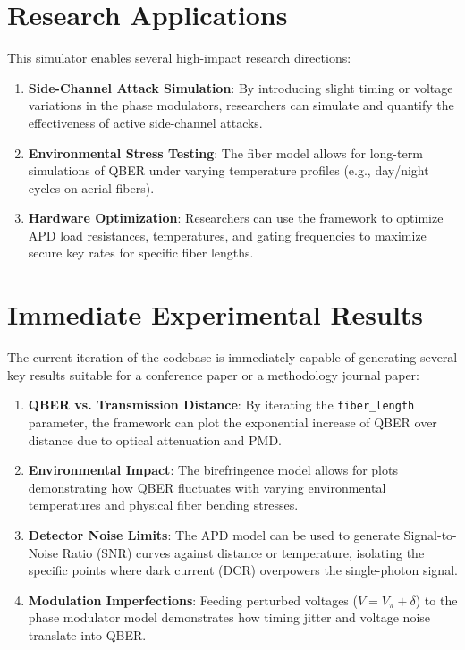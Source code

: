 \documentclass[12pt,a4paper]{article}
\begin{document}
\section{Research Applications}
This simulator enables several high-impact research directions:
\begin{enumerate}
    \item \textbf{Side-Channel Attack Simulation}: By introducing slight timing or voltage variations in the phase modulators, researchers can simulate and quantify the effectiveness of active side-channel attacks.
    \item \textbf{Environmental Stress Testing}: The fiber model allows for long-term simulations of QBER under varying temperature profiles (e.g., day/night cycles on aerial fibers).
    \item \textbf{Hardware Optimization}: Researchers can use the framework to optimize APD load resistances, temperatures, and gating frequencies to maximize secure key rates for specific fiber lengths.
\end{enumerate}

\section{Immediate Experimental Results}
The current iteration of the codebase is immediately capable of generating several key results suitable for a conference paper or a methodology journal paper:
\begin{enumerate}
    \item \textbf{QBER vs. Transmission Distance}: By iterating the \texttt{fiber\_length} parameter, the framework can plot the exponential increase of QBER over distance due to optical attenuation and PMD.
    \item \textbf{Environmental Impact}: The birefringence model allows for plots demonstrating how QBER fluctuates with varying environmental temperatures and physical fiber bending stresses.
    \item \textbf{Detector Noise Limits}: The APD model can be used to generate Signal-to-Noise Ratio (SNR) curves against distance or temperature, isolating the specific points where dark current (DCR) overpowers the single-photon signal.
    \item \textbf{Modulation Imperfections}: Feeding perturbed voltages ($V = V_\pi + \delta$) to the phase modulator model demonstrates how timing jitter and voltage noise translate into QBER.
\end{enumerate}
\end{document}
